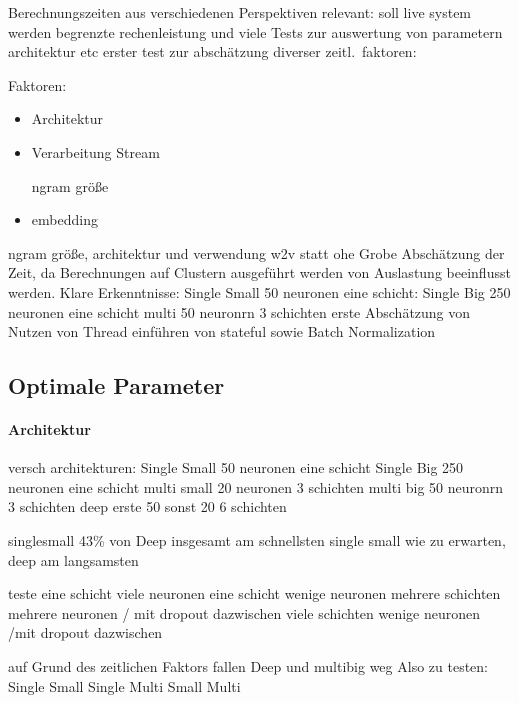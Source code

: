             Berechnungszeiten aus verschiedenen Perspektiven relevant:
            soll live system werden
            begrenzte rechenleistung und viele Tests zur auswertung von parametern architektur etc
            erster test zur abschätzung diverser zeitl.\ faktoren:

            Faktoren:
            \begin{itemize}
                \item Architektur
                \item Verarbeitung Stream

                     ngram größe
                \item embedding
            \end{itemize}
            ngram größe, architektur und verwendung w2v statt ohe
            Grobe Abschätzung der Zeit, da Berechnungen auf Clustern ausgeführt werden von Auslastung beeinflusst werden.
            Klare Erkenntnisse:
            Single Small 50 neuronen eine schicht:
            Single Big 250 neuronen eine schicht
            multi 50 neuronrn 3 schichten
            erste Abschätzung von Nutzen von Thread 
            einführen von stateful sowie Batch Normalization
        \subsection{Optimale Parameter}
            \paragraph{Architektur}
                versch architekturen:
                Single Small 50 neuronen eine schicht
                Single Big 250 neuronen eine schicht
                multi small 20 neuronen 3 schichten
                multi big 50 neuronrn 3 schichten
                deep erste 50 sonst 20 6 schichten

                singlesmall 43\% von Deep
                insgesamt am schnellsten single small
                wie zu erwarten,  deep am langsamsten

                teste eine schicht viele neuronen 
                eine schicht wenige neuronen
                mehrere schichten mehrere neuronen / mit dropout dazwischen
                viele schichten wenige neuronen /mit dropout dazwischen

                auf Grund des zeitlichen Faktors fallen Deep und multibig weg
                Also zu testen:
                Single Small
                Single 
                Multi Small
                Multi 

